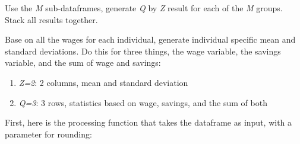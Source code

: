 \documentclass[
]{book}
\providecommand{\tightlist}{%
  \setlength{\itemsep}{0pt}\setlength{\parskip}{0pt}}
\begin{document}
Use the \emph{M} sub-dataframes, generate \emph{Q} by \emph{Z} result for each of the \emph{M} groups. Stack all results together.

Base on all the wages for each individual, generate individual specific mean and standard deviations. Do this for three things, the wage variable, the savings variable, and the sum of wage and savings:

\begin{enumerate}
\def\labelenumi{\arabic{enumi}.}
\tightlist
\item
  \emph{Z=2}: 2 columns, mean and standard deviation
\item
  \emph{Q=3}: 3 rows, statistics based on wage, savings, and the sum of both
\end{enumerate}

First, here is the processing function that takes the dataframe as input, with a parameter for rounding:
\end{document}
